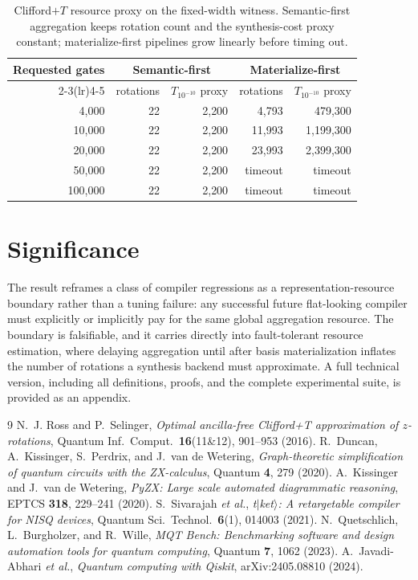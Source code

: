 \documentclass[11pt]{article}
\begin{document}
\begin{table}[ht]
\centering
\small
\begin{tabular}{rrrrr}
\toprule
Requested gates & \multicolumn{2}{c}{Semantic-first} & \multicolumn{2}{c}{Materialize-first} \\
\cmidrule(lr){2-3}\cmidrule(lr){4-5}
 & rotations & $T_{10^{-10}}$ proxy & rotations & $T_{10^{-10}}$ proxy \\
\midrule
4{,}000   & 22 & 2{,}200 & 4{,}793  & 479{,}300 \\
10{,}000  & 22 & 2{,}200 & 11{,}993 & 1{,}199{,}300 \\
20{,}000  & 22 & 2{,}200 & 23{,}993 & 2{,}399{,}300 \\
50{,}000  & 22 & 2{,}200 & timeout  & timeout \\
100{,}000 & 22 & 2{,}200 & timeout  & timeout \\
\bottomrule
\end{tabular}
\caption{Clifford$+T$ resource proxy on the fixed-width witness. Semantic-first aggregation keeps
rotation count and the synthesis-cost proxy constant; materialize-first pipelines grow linearly
before timing out.}
\label{tab:resource}
\end{table}

\section*{Significance}

The result reframes a class of compiler regressions as a representation-resource boundary rather
than a tuning failure: any successful future flat-looking compiler must explicitly or implicitly pay
for the same global aggregation resource. The boundary is falsifiable, and it carries directly into
fault-tolerant resource estimation, where delaying aggregation until after basis materialization
inflates the number of rotations a synthesis backend must approximate. A full technical version,
including all definitions, proofs, and the complete experimental suite, is provided as an appendix.

\clearpage
\begin{thebibliography}{9}
\small
{} N.~J. Ross and P.~Selinger, \emph{Optimal ancilla-free Clifford+T approximation of
$z$-rotations}, Quantum Inf.\ Comput.\ \textbf{16}(11\&12), 901--953 (2016).
 R.~Duncan, A.~Kissinger, S.~Perdrix, and J.~van de Wetering, \emph{Graph-theoretic
simplification of quantum circuits with the ZX-calculus}, Quantum \textbf{4}, 279 (2020).
 A.~Kissinger and J.~van de Wetering, \emph{PyZX: Large scale automated diagrammatic
reasoning}, EPTCS \textbf{318}, 229--241 (2020).
 S.~Sivarajah \emph{et al.}, \emph{t$|$ket$\rangle$: A retargetable compiler for NISQ
devices}, Quantum Sci.\ Technol.\ \textbf{6}(1), 014003 (2021).
 N.~Quetschlich, L.~Burgholzer, and R.~Wille, \emph{MQT Bench: Benchmarking software and
design automation tools for quantum computing}, Quantum \textbf{7}, 1062 (2023).
 A.~Javadi-Abhari \emph{et al.}, \emph{Quantum computing with Qiskit},
arXiv:2405.08810 (2024).
\end{thebibliography}
\end{document}

